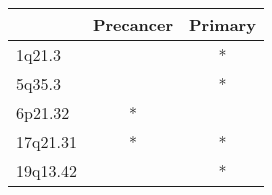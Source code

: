 \begin{tabular}{lcc}
\toprule
{} & Precancer & Primary \\
\midrule
1q21.3   &           &       * \\
5q35.3   &           &       * \\
6p21.32  &         * &         \\
17q21.31 &         * &       * \\
19q13.42 &           &       * \\
\bottomrule
\end{tabular}
